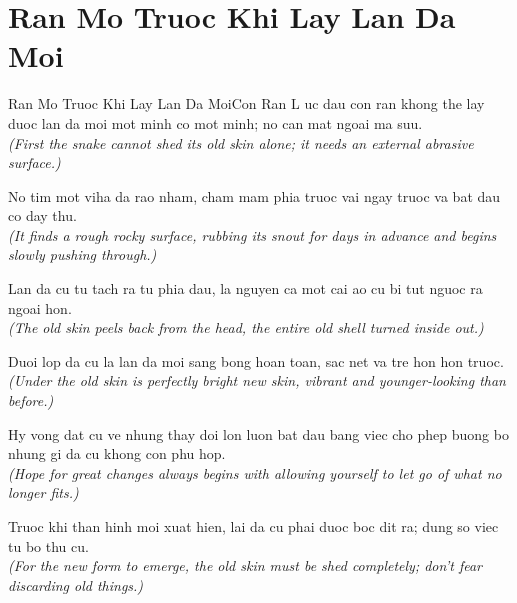 \section{Ran Mo Truoc Khi Lay Lan Da Moi}
\begin{truyen}{Ran Mo Truoc Khi Lay Lan Da Moi}{Con Ran}
L uc dau con ran khong the lay duoc lan da moi mot minh co mot minh; no can mat ngoai ma suu.\\
\textit{(First the snake cannot shed its old skin alone; it needs an external abrasive surface.)}

No tim mot viha da rao nham, cham mam phia truoc vai ngay truoc va bat dau co day thu.\\
\textit{(It finds a rough rocky surface, rubbing its snout for days in advance and begins slowly pushing through.)}

Lan da cu tu tach ra tu phia dau, la nguyen ca mot cai ao cu bi tut nguoc ra ngoai hon.\\
\textit{(The old skin peels back from the head, the entire old shell turned inside out.)}

Duoi lop da cu la lan da moi sang bong hoan toan, sac net va tre hon hon truoc.\\
\textit{(Under the old skin is perfectly bright new skin, vibrant and younger-looking than before.)}

Hy vong dat cu ve nhung thay doi lon luon bat dau bang viec cho phep buong bo nhung gi da cu khong con phu hop.\\
\textit{(Hope for great changes always begins with allowing yourself to let go of what no longer fits.)}

\end{truyen}
\begin{baihoc}
  Truoc khi than hinh moi xuat hien, lai da cu phai duoc boc dit ra; dung so viec tu bo thu cu.\\
  \textit{(For the new form to emerge, the old skin must be shed completely; don't fear discarding old things.)}
\end{baihoc}

